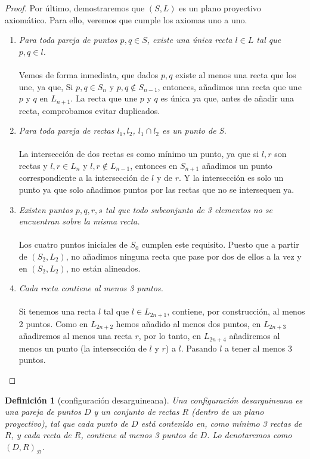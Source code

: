 \documentclass[12pt,a4paper]{article}
\newcommand{\D}{\mathcal{D}}
\theoremstyle{break}
\newtheorem{defi}{Definición}
\newtheorem*{proof}{Solución}
\begin{document}
\begin{proof}
	Por último, demostraremos que $(S,L)$ es un plano proyectivo axiomático. Para
	ello, veremos que cumple los axiomas uno a uno.
	\begin{enumerate}[\bf {A}1)]
		\item \textit{Para toda pareja de puntos $p,q \in S$, existe una única
			recta $l \in L$ tal que $p, q \in l$.} \\ \\
			Vemos de forma inmediata, que dados $p,q$ existe al menos una
			recta que los une, ya que, Si $p,q \in S_n$ y $p,q \notin
			S_{n-1}$, entonces, añadimos una recta que une $p$ y $q$ en
			$L_{n+1}$. La recta que une $p$ y $q$ es única ya que, antes de
			añadir una recta, comprobamos evitar duplicados.
		\item \textit{Para toda pareja de rectas $l_1, l_2$, $l_1 \cap l_2$
			es un punto de S.} \\ \\
			La intersección de dos rectas es como mínimo un punto, ya que
			si $l,r$ son rectas y $l,r \in L_n$ y $l,r \notin L_{n-1}$,
			entonces en $S_{n+1}$ añadimos un punto correspondiente a la
			intersección de $l$ y de $r$. Y la intersección es solo un
			punto ya que solo añadimos puntos por las rectas que no se
			intersequen ya.
		\item \textit{Existen puntos $p,q,r,s$ tal que todo subconjunto de 3
			elementos no se encuentran sobre la misma recta.} \\ \\
			Los cuatro puntos iniciales de $S_0$ cumplen este requisito.
			Puesto que a partir de $(S_2,L_2)$, no añadimos ninguna recta
			que pase por dos de ellos a la vez y en $(S_2,L_2)$, no están
			alineados.
		\item \textit{Cada recta contiene al menos 3 puntos.} \\ \\
			Si tenemos una recta $l$ tal que $l\in L_{2n+1}$, contiene, por
			construcción, al menos 2 puntos. Como en $L_{2n+2}$ hemos
			añadido al menos dos puntos, en $L_{2n+3}$ añadiremos al
			menos una recta $r$, por lo tanto, en $L_{2n+4}$ añadiremos al
			menos un punto (la intersección de $l$ y $r$) a $l$.
			Pasando $l$ a tener al menos 3 puntos.
	\end{enumerate}
\end{proof}

\begin{defi}[configuración desarguineana]
	Una configuración desarguineana es una pareja de puntos $D$ y un conjunto de
	rectas $R$ (dentro de un plano proyectivo), tal que cada punto de $D$ está
	contenido en, como mínimo 3 rectas de $R$, y cada recta de $R$, contiene al
	menos 3 puntos de $D$. Lo denotaremos como $(D,R)_\D$.
\end{defi}
\end{document}
